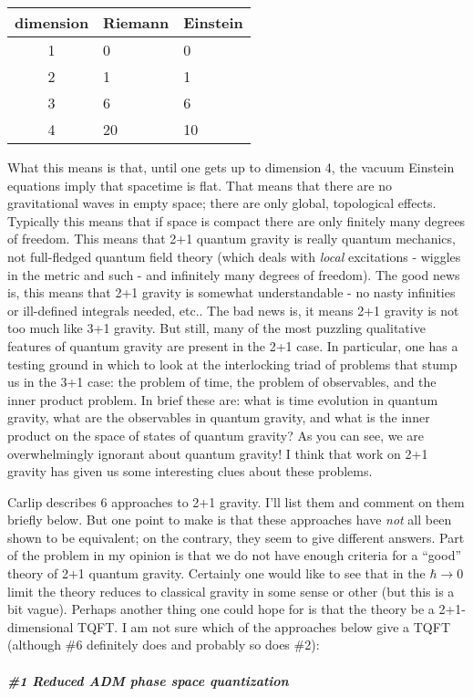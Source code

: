 \documentclass{article}
\begin{document}
\begin{longtable}[]{@{}cll@{}}
\toprule
dimension & Riemann & Einstein\tabularnewline
\midrule
\endhead
1 & 0 & 0\tabularnewline
2 & 1 & 1\tabularnewline
3 & 6 & 6\tabularnewline
4 & 20 & 10\tabularnewline
\bottomrule
\end{longtable}

What this means is that, until one gets up to dimension 4, the vacuum
Einstein equations imply that spacetime is flat. That means that there
are no gravitational waves in empty space; there are only global,
topological effects. Typically this means that if space is compact there
are only finitely many degrees of freedom. This means that 2+1 quantum
gravity is really quantum mechanics, not full-fledged quantum field
theory (which deals with \emph{local} excitations - wiggles in the
metric and such - and infinitely many degrees of freedom). The good news
is, this means that 2+1 gravity is somewhat understandable - no nasty
infinities or ill-defined integrals needed, etc.. The bad news is, it
means 2+1 gravity is not too much like 3+1 gravity. But still, many of
the most puzzling qualitative features of quantum gravity are present in
the 2+1 case. In particular, one has a testing ground in which to look
at the interlocking triad of problems that stump us in the 3+1 case: the
problem of time, the problem of observables, and the inner product
problem. In brief these are: what is time evolution in quantum gravity,
what are the observables in quantum gravity, and what is the inner
product on the space of states of quantum gravity? As you can see, we
are overwhelmingly ignorant about quantum gravity! I think that work on
2+1 gravity has given us some interesting clues about these problems.

Carlip describes 6 approaches to 2+1 gravity. I'll list them and comment
on them briefly below. But one point to make is that these approaches
have \emph{not} all been shown to be equivalent; on the contrary, they
seem to give different answers. Part of the problem in my opinion is
that we do not have enough criteria for a ``good'' theory of 2+1 quantum
gravity. Certainly one would like to see that in the \(\hbar\to 0\)
limit the theory reduces to classical gravity in some sense or other
(but this is a bit vague). Perhaps another thing one could hope for is
that the theory be a 2+1-dimensional TQFT. I am not sure which of the
approaches below give a TQFT (although \#6 definitely does and probably
so does \#2):

\hypertarget{reduced-adm-phase-space-quantization}{%
\subparagraph{\#1 Reduced ADM phase space
quantization}\label{reduced-adm-phase-space-quantization}}
\end{document}
